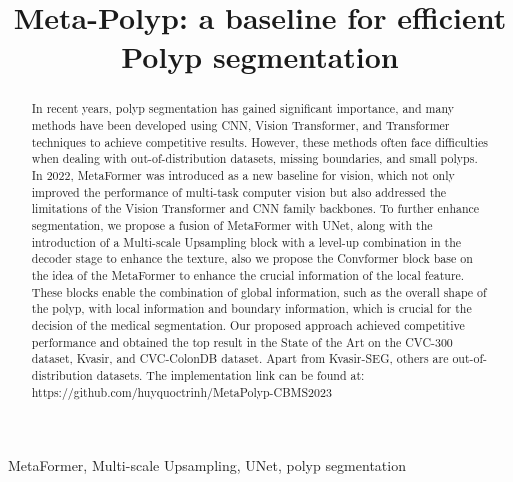\documentclass[conference]{IEEEtran}
\begin{document}
\title{Meta-Polyp: a baseline for efficient Polyp segmentation \\
}

\author{
 
}

\maketitle

\begin{abstract}
In recent years, polyp segmentation has gained significant importance, and many methods have been developed using CNN, Vision Transformer, and Transformer techniques to achieve competitive results. However, these methods often face difficulties when dealing with out-of-distribution datasets, missing boundaries, and small polyps. In 2022, MetaFormer was introduced as a new baseline for vision, which not only improved the performance of multi-task computer vision but also addressed the limitations of the Vision Transformer and CNN family backbones. To further enhance segmentation, we propose a fusion of MetaFormer with UNet, along with the introduction of a Multi-scale Upsampling block with a level-up combination in the decoder stage to enhance the texture, also we propose the Convformer block base on the idea of the MetaFormer to enhance the crucial information of the local feature. These blocks enable the combination of global information, such as the overall shape of the polyp, with local information and boundary information, which is crucial for the decision of the medical segmentation. Our proposed approach achieved competitive performance and obtained the top result in the State of the Art on the CVC-300 dataset, Kvasir, and CVC-ColonDB dataset. Apart from Kvasir-SEG, others are out-of-distribution datasets. The implementation link can be found at: https://github.com/huyquoctrinh/MetaPolyp-CBMS2023
\end{abstract}

\begin{IEEEkeywords}
MetaFormer, Multi-scale Upsampling, UNet, polyp segmentation
\end{IEEEkeywords}
\end{document}
